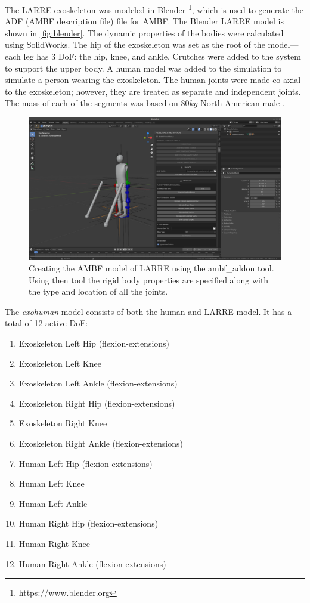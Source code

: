  The LARRE exoskeleton was modeled in Blender \footnote{https://www.blender.org}, which is used to generate the ADF (AMBF description file) file for AMBF. The Blender LARRE model is shown in \autoref{fig:blender}. The dynamic properties of the bodies were calculated using SolidWorks. The hip of the exoskeleton was set as the root of the model—each leg has 3 DoF: the hip, knee, and ankle. Crutches were added to the system to support the upper body. A human model was added to the simulation to simulate a person wearing the exoskeleton. The human joints were made co-axial to the exoskeleton; however, they are treated as separate and independent joints. The mass of each of the segments was based on $80kg$ North American male \cite{BMI} \cite{drillis1964body}.
 
 \begin{figure}[h]
     \centering
     \includegraphics[scale=0.2]{images/sim/blender.png}
     \caption[Blender Model of LARRE]{Creating the AMBF model of LARRE using the ambf\_addon tool. Using then tool the rigid body properties are specified along with the type and location of all the joints.}
     \label{fig:blender}
 \end{figure}
 
 
 The \textit{exohuman} model consists of both the human and LARRE model. It has a total of 12 active DoF:

\begin{enumerate}
  \item Exoskeleton Left Hip (flexion-extensions)
  \item Exoskeleton Left Knee
  \item Exoskeleton Left Ankle (flexion-extensions)
  \item Exoskeleton Right Hip (flexion-extensions)
  \item Exoskeleton Right Knee
  \item Exoskeleton Right Ankle (flexion-extensions)
  \item Human Left Hip (flexion-extensions)
  \item Human Left Knee
  \item Human Left Ankle
  \item Human Right Hip (flexion-extensions)
  \item Human Right Knee
  \item Human Right Ankle (flexion-extensions)
\end{enumerate}


